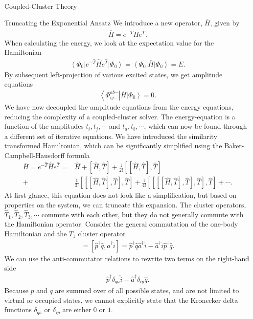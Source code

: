 \documentclass[twoside,english]{uiofysmaster}
\begin{document}
\begin{chapter}{Coupled-Cluster Theory}
\begin{section}{Truncating the Exponential Ansatz}
	  	We introduce a new operator, $\overline H$, given by 
	  	\begin{align}
	  		\overline H = e^{-\hat T} \hat H e^{\hat T} .
	  	\end{align}
	  	When calculating the energy, we look at the expectation value for the Hamiltonian 
	  	\begin{align}
	  		\left< \Phi_0 \right| e^{-\hat T} \hat H e^{\hat T} \left| \Phi_0 \right> = \left< \Phi_0 \right| \overline H \left| \Phi_0 \right> = E.
	  	\end{align}
	  	By subsequent left-projection of various excited states, we get amplitude equations
	  	\begin{align}
	  		\left< \Phi_{ij\cdots}^{ab\cdots} \right| \overline H \left| \Phi_0 \right> = 0.
	  	\end{align}
	  	We have now decoupled the amplitude equations from the energy equations, reducing the complexity of a coupled-cluster solver. The energy-equation is a function of the amplitudes $t_i, t_j, \cdots$ and $t_a, t_b, \cdots$, which can now be found through a different set of iterative equations. We have introduced the similarity transformed Hamiltonian, which can be significantly simplified using the Baker-Campbell-Hausdorff formula \cite{Crawford}
	  	\begin{align}
	  		\overline H = e^{-\hat T} \hat H e^{\hat T} =& \hat H + [ \hat H, \hat T] + \frac{1}{2!} [[\hat H, \hat T], \hat T] \\ + &\frac{1}{3!} [[[ \hat H, \hat T ], \hat T ], \hat T ] + \frac{1}{4!} [[[[\hat H, \hat T], \hat T], \hat T], \hat T] + \cdots \nonumber .
	  	\end{align}
	  	At first glance, this equation does not look like a simplification, but based on properties on the system, we can truncate this expansion. The cluster operators, $\hat T_1, \hat T_2, \hat T_3, \cdots$ commute with each other, but they do not generally commute with the Hamiltonian operator. Consider the general commutation of the one-body Hamiltonian and the $T_1$ cluster operator
	  	\begin{align}
	  		[\hat H_0, \hat T_1] = [\hat p^\dagger \hat q, \hat a^\dagger \hat i] = \hat p^\dagger \hat q \hat a^\dagger \hat i - \hat a^\dagger \hat i \hat p^\dagger \hat q.
	  	\end{align}
	  	We can use the anti-commutator relations to rewrite two terms on the right-hand side
	  	\begin{align}
	  		\hat p^\dagger \delta_{qa} \hat i - \hat a^\dagger \delta_{ip} \hat q.
	  	\end{align}
	  	Because $p$ and $q$ are summed over of all possible states, and are not limited to virtual or occupied states, we cannot explicitly state that the Kronecker delta functions $\delta_{qa}$ or $\delta_{ip}$ are either $0$ or $1$. 


\end{section}
\end{chapter}
\end{document}
